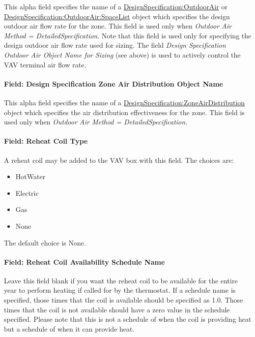 This alpha field specifies the name of a \hyperref[designspecificationoutdoorair]{DesignSpecification:OutdoorAir} or \hyperref[designspecificationoutdoorairspacelist]{DesignSpecification:OutdoorAir:SpaceList} object which specifies the design outdoor air flow rate for the zone. This field is used only when \emph{Outdoor Air Method = DetailedSpecification}. Note that this field is used only for specifying the design outdoor air flow rate used for sizing. The field \emph{Design Specification Outdoor Air Object Name for Sizing} (see above) is used to actively control the VAV terminal air flow rate.

\paragraph{Field: Design Specification Zone Air Distribution Object Name}\label{field-design-specification-zone-air-distribution-object-name-9}

This alpha field specifies the name of a \hyperref[designspecificationzoneairdistribution]{DesignSpecification:ZoneAirDistribution} object which specifies the air distribution effectiveness for the zone. This field is used only when \emph{Outdoor Air Method = DetailedSpecification}.

\paragraph{Field: Reheat Coil Type}\label{field-reheat-coil-type-2}

A reheat coil may be added to the VAV box with this field. The choices are:

\begin{itemize}
\item
  HotWater
\item
  Electric
\item
  Gas
\item
  None
\end{itemize}

The default choice is None.

\paragraph{Field: Reheat Coil Availability Schedule Name}\label{field-reheat-coil-availability-schedule-name-2}

Leave this field blank if you want the reheat coil to be available for the entire year to perform heating if called for by the thermostat. If a schedule name is specified, those times that the coil is available should be specified as 1.0. Those times that the coil is not available should have a zero value in the schedule specified. Please note that this is not a schedule of when the coil is providing heat but a schedule of when it can provide heat.

